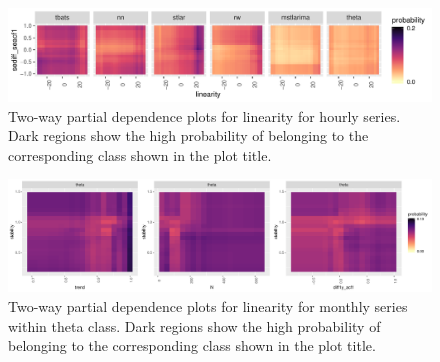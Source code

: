 \documentclass[11pt,a4paper,]{article}
\begin{document}
\begin{figure}[h]

{\centering \includegraphics[width=\textwidth]{figure/h2dpdp-1} 

}

\caption{Two-way partial dependence plots for linearity for hourly series. Dark regions show the high probability of belonging to the corresponding class shown in the plot title.}\label{fig:h2dpdp}
\end{figure}

\begin{figure}[h]

{\centering \includegraphics[width=\textwidth]{figure/thetapdp-1} 

}

\caption{Two-way partial dependence plots for linearity for monthly series within theta class. Dark regions show the high probability of belonging to the corresponding class shown in the plot title.}\label{fig:thetapdp}
\end{figure}
\end{document}

